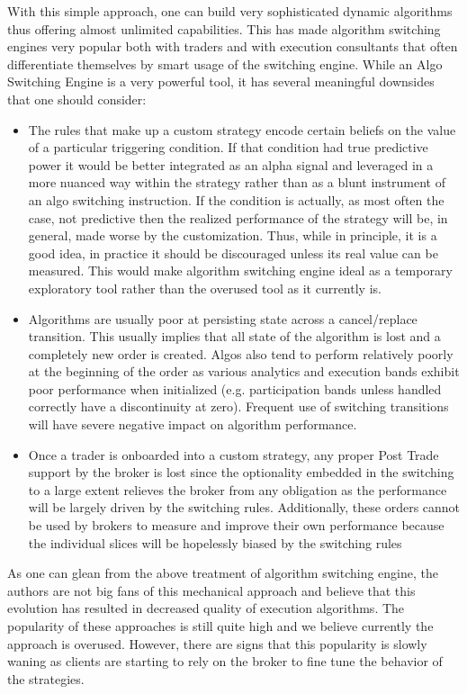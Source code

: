 With this simple approach, one can build very sophisticated dynamic algorithms thus offering almost unlimited capabilities. This has made algorithm switching engines very popular both with traders and with execution consultants that often differentiate themselves by smart usage of the switching engine. While an Algo Switching Engine is a very powerful tool, it has several meaningful downsides that one should consider:


\begin{itemize}
\item The rules that make up a custom strategy encode certain beliefs on the value of a particular triggering condition. If that condition had true predictive power it would be better integrated as an alpha signal and leveraged in a more nuanced way within the strategy rather than as a blunt instrument of an algo switching instruction. If the condition is actually, as most often the case, not predictive then the realized performance of the strategy will be, in general, made worse by the customization. Thus, while in principle, it is a good idea, in practice it should be discouraged unless its real value can be measured. This would make algorithm switching engine ideal as a temporary exploratory tool rather than the overused tool as it currently is.

\item  Algorithms are usually poor at persisting state across a cancel/replace transition. This usually implies that all state of the algorithm is lost and a completely new order is created. Algos also tend to perform relatively poorly at the beginning of the order as various analytics and execution bands exhibit poor performance when initialized (e.g. participation bands unless handled correctly have a discontinuity at zero). Frequent use of switching transitions will have severe negative impact on algorithm performance.

\item Once a trader is onboarded into a custom strategy, any proper Post Trade support by the broker is lost since the optionality embedded in the switching to a large extent relieves the broker from any obligation as the performance will be largely driven by the switching rules. Additionally, these orders cannot be used by brokers to measure and improve their own performance because the individual slices will be hopelessly biased by the switching rules
\end{itemize}


As one can glean from the above treatment of algorithm switching engine, the authors are not big fans of this mechanical approach and believe that this evolution has resulted in decreased quality of execution algorithms. The popularity of these approaches is still quite high and we believe currently the approach is overused. However, there are signs that this popularity is slowly waning as clients are starting to rely on the broker to fine tune the behavior of the strategies. \twomedskip


